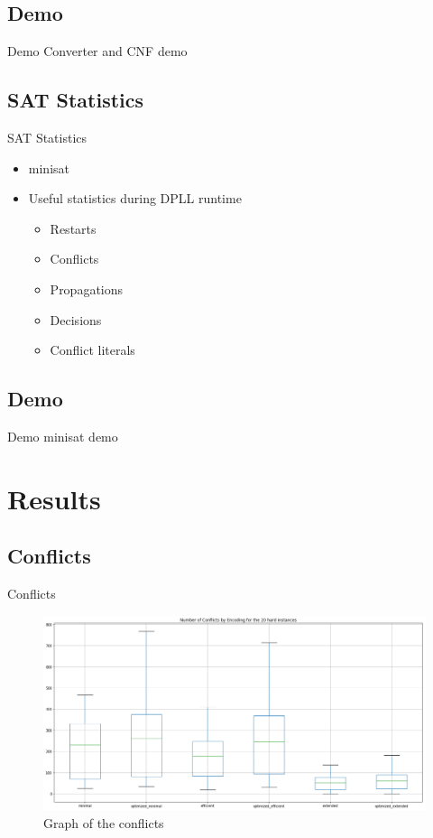 \documentclass[11pt]{beamer}
\begin{document}
\subsection{Demo}
\begin{frame}{Demo}
Converter and CNF demo
\end{frame}

\subsection{SAT Statistics}
\begin{frame}{SAT Statistics}
\begin{itemize}
\item minisat
\item Useful statistics during DPLL runtime
\begin{itemize}
\item Restarts
\item Conflicts
\item Propagations
\item Decisions
\item Conflict literals
\end{itemize}
\end{itemize}
\end{frame}

\subsection{Demo}
\begin{frame}{Demo}
minisat demo
\end{frame}

\section{Results}


\subsection{Conflicts}
\begin{frame}{Conflicts}
\begin{figure}
\includegraphics[scale=0.25]{report/conflicts}
\caption{Graph of the conflicts}
\end{figure}
\end{frame}
\end{document}
